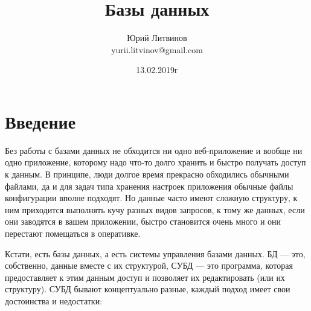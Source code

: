 \documentclass[a5paper]{article}
\title{Базы данных}
\author{Юрий Литвинов\\\small{yurii.litvinov@gmail.com}}
\date{13.02.2019г}
\begin{document}
\maketitle
\thispagestyle{empty}

\section{Введение}

Без работы с базами данных не обходится ни одно веб-приложение и вообще ни одно приложение, которому надо что-то долго хранить и быстро получать доступ к данным. В принципе, люди долгое время прекрасно обходились обычными файлами, да и для задач типа хранения настроек приложения обычные файлы конфигурации вполне подходят. Но данные часто имеют сложную структуру, к ним приходится выполнять кучу разных видов запросов, к тому же данных, если они заводятся в вашем приложении, быстро становится очень много и они перестают помещаться в оперативке.

Кстати, есть базы данных, а есть системы управления базами данных. БД --- это, собственно, данные вместе с их структурой, СУБД --- это программа, которая предоставляет к этим данным доступ и позволяет их редактировать (или их структуру). СУБД бывают концептуально разные, каждый подход имеет свои достоинства и недостатки:
\end{document}
